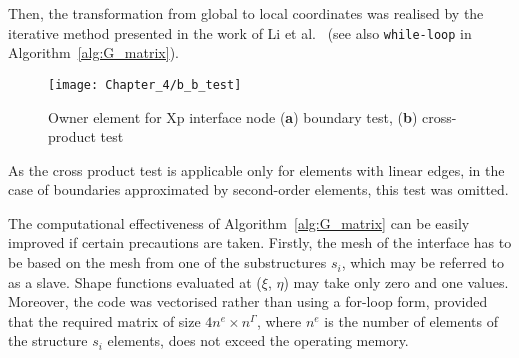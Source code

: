 Then, the transformation from global to local coordinates was realised by the iterative method presented in the work of Li et al.~\cite{li2014efficient} (see also \verb+while-loop+ in Algorithm~\ref{alg:G_matrix}).
\begin{figure}[!tbh]
	\begin{center}
		\texttt{[image: Chapter\_4/b\_b\_test]}
	\end{center}
	\caption{Owner element for Xp interface node (\textbf{a}) boundary test, (\textbf{b}) cross-product test}
	\label{fig:b_b_test}
\end{figure}
As the cross product test is applicable only for elements with linear edges, in the case of boundaries approximated by second-order elements, this test was omitted.

The computational effectiveness of Algorithm~\ref{alg:G_matrix} can be easily improved if certain precautions are taken.
Firstly, the mesh of the interface has to be based on the mesh from one of the substructures \(s_{i}\), which may be referred to as a slave.
Shape functions evaluated at (\(\xi\), \(\eta\)) may take only zero and one values.
Moreover, the code was vectorised rather than using a for-loop form, provided that the required matrix of size \(4n^e\times n^{\Gamma}\), where \(n^e\) is the number of elements of the structure \(s_i\) elements, does not exceed the operating memory.